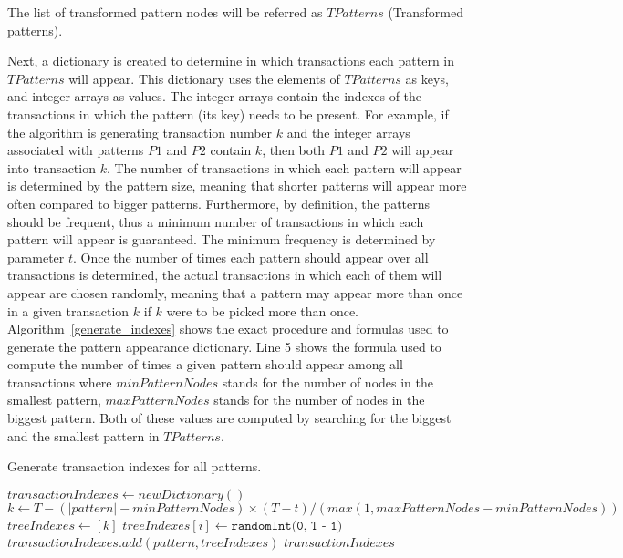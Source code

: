 \documentclass{acm_proc_article-sp-sigmod09}
\begin{document}
The list of transformed pattern nodes will be referred as $TPatterns$ (Transformed patterns).

Next, a dictionary is created to determine in which transactions each pattern in $TPatterns$ will appear. This dictionary uses the elements of $TPatterns$ as keys, and integer arrays as values. The integer arrays contain the indexes of the transactions in which the pattern (its key) needs to be present. For example, if the algorithm is generating transaction number $k$ and the integer arrays associated with patterns $P1$ and $P2$ contain $k$, then both $P1$ and $P2$ will appear into transaction $k$. The number of transactions in which each pattern will appear is determined by the pattern size, meaning that shorter patterns will appear more often compared to bigger patterns. Furthermore, by definition, the patterns should be frequent, thus a minimum number of transactions in which each pattern will appear is guaranteed. The minimum frequency is determined by parameter $t$. Once the number of times each pattern should appear over all transactions is determined, the actual transactions in which each of them will appear are chosen randomly, meaning that a pattern may appear more than once in a given transaction $k$ if $k$ were to be picked more than once. Algorithm~\ref{generate_indexes} shows the exact procedure and formulas used to generate the pattern appearance dictionary. Line 5 shows the formula used to compute the number of times a given pattern should appear among all transactions where $minPatternNodes$ stands for the number of nodes in the smallest pattern, $maxPatternNodes$ stands for the number of nodes in the biggest pattern. Both of these values are computed by searching for the biggest and the smallest pattern in $TPatterns$.
\begin{algorithm}
\caption{Generate transaction indexes for all patterns.}
\label{generate_indexes}
\begin{algorithmic}[1]
\State $transactionIndexes \gets new Dictionary()$
	\State $k \gets T - (|pattern| - minPatternNodes) \times (T - t) / (max(1, maxPatternNodes - minPatternNodes))$
	\State $treeIndexes \gets [k]$
		\State $treeIndexes[i] \gets \texttt{randomInt(0, T - 1)}$
	\EndFor
	\State $transactionIndexes.add(pattern, treeIndexes)$
\EndFor
\Return $transactionIndexes$
\EndFunction
\end{algorithmic}
\end{algorithm}
\end{document}
